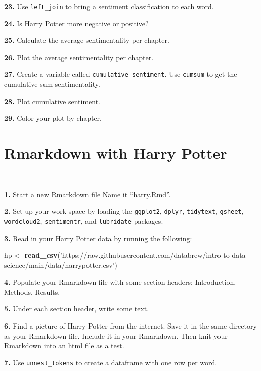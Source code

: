 \documentclass[]{book}
\newenvironment{Shaded}{\begin{snugshade}}{\end{snugshade}}
\newcommand{\KeywordTok}[1]{\textcolor[rgb]{0.13,0.29,0.53}{\textbf{#1}}}
\newcommand{\NormalTok}[1]{#1}
\newcommand{\StringTok}[1]{\textcolor[rgb]{0.31,0.60,0.02}{#1}}
\begin{document}
\textbf{23.} Use \texttt{left\_join} to bring a sentiment classification to each word.

\textbf{24.} Is Harry Potter more negative or positive?

\textbf{25.} Calculate the average sentimentality per chapter.

\textbf{26.} Plot the average sentimentality per chapter.

\textbf{27.} Create a variable called \texttt{cumulative\_sentiment}. Use \texttt{cumsum} to get the cumulative sum sentimentality.

\textbf{28.} Plot cumulative sentiment.

\textbf{29.} Color your plot by chapter.

\hypertarget{rmarkdown-with-harry-potter}{%
\chapter{Rmarkdown with Harry Potter}\label{rmarkdown-with-harry-potter}}

~

\textbf{1.} Start a new Rmarkdown file Name it ``harry.Rmd''.

\textbf{2.} Set up your work space by loading the \texttt{ggplot2}, \texttt{dplyr}, \texttt{tidytext}, \texttt{gsheet}, \texttt{wordcloud2}, \texttt{sentimentr}, and \texttt{lubridate} packages.

\textbf{3.} Read in your Harry Potter data by running the following:

\begin{Shaded}
\begin{Highlighting}[]
\NormalTok{hp <-}\StringTok{ }\KeywordTok{read_csv}\NormalTok{(}\StringTok{'https://raw.githubusercontent.com/databrew/intro-to-data-science/main/data/harrypotter.csv'}\NormalTok{)}
\end{Highlighting}
\end{Shaded}

\textbf{4.} Populate your Rmarkdown file with some section headers: Introduction, Methods, Results.

\textbf{5.} Under each section header, write some text.

\textbf{6.} Find a picture of Harry Potter from the internet. Save it in the same directory as your Rmarkdown file. Include it in your Rmarkdown. Then knit your Rmarkdown into an html file as a test.

\textbf{7.} Use \texttt{unnest\_tokens} to create a dataframe with one row per word.
\end{document}
